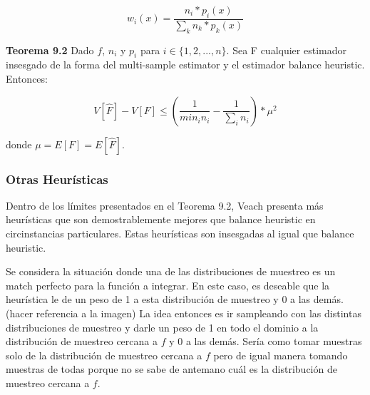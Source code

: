 \documentclass{article}
\begin{document}
$$ w_{i}(x) = \frac{n_{i} * p_{i}(x)}{\sum_{k} n_{k} * p_{k}(x)}$$

\textbf{Teorema 9.2} Dado $f$, $n_{i}$ y $p_{i}$ para $i \in \{1, 2, ..., n\}$. Sea F cualquier estimador insesgado de la forma del multi-sample estimator y  el estimador balance heuristic. Entonces:

$$V[\hat{F}] - V[F] \leq ( \frac{1}{min_{i} n_{i}} - \frac{1}{\sum_{i} n_{i}} ) * \mu^{2}$$

donde $\mu = E[F] = E[\hat{F}]$.









\subsubsection{Otras Heurísticas}

Dentro de los límites presentados en el Teorema 9.2, Veach presenta más heurísticas que son demostrablemente mejores que balance heuristic en circinstancias particulares.
Estas heurísticas son insesgadas al igual que balance heuristic.

Se considera la situación donde una de las distribuciones de muestreo es un match perfecto para la función a integrar. En este caso, es deseable que la heurística le de un peso de 1 a esta distribución de muestreo y 0 a las demás. (hacer referencia a la imagen)
La idea entonces es ir sampleando con las distintas distribuciones de muestreo y darle un peso de 1 en todo el dominio a la distribución de muestreo cercana a $f$ y 0 a las demás.
Sería como tomar muestras solo de la distribución de muestreo cercana a $f$ pero de igual manera tomando muestras de todas porque no se sabe de antemano cuál es la distribución de muestreo cercana a $f$.
\end{document}
